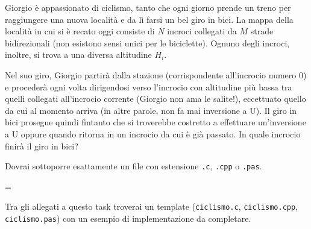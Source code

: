 \usepackage{xcolor}
\usepackage{afterpage}
\usepackage{pifont,mdframed}
\usepackage[bottom]{footmisc}

\makeatletter
\gdef\this@inputfilename{input.txt}
\gdef\this@outputfilename{output.txt}
\makeatother

\newcommand{\inputfile}{\texttt{input.txt}}
\newcommand{\outputfile}{\texttt{output.txt}}

\newenvironment{warning}
  {\par\begin{mdframed}[linewidth=2pt,linecolor=gray]%
    \begin{list}{}{\leftmargin=1cm
                   \labelwidth=\leftmargin}\item[\Large\ding{43}]}
  {\end{list}\end{mdframed}\par}

	Giorgio è appassionato di ciclismo, tanto che ogni giorno prende un treno per raggiungere una nuova localit\`a e da lì farsi un bel giro in bici. La mappa della localit\`a in cui si \`e recato oggi consiste di $N$ incroci collegati da $M$ strade bidirezionali (non esistono sensi unici per le biciclette). Ognuno degli incroci, inoltre, si trova a una diversa altitudine $H_i$.

	Nel suo giro, Giorgio partir\`a dalla stazione (corrispondente all'incrocio numero 0) e proceder\`a ogni volta dirigendosi verso l'incrocio con altitudine più bassa tra quelli collegati all'incrocio corrente (Giorgio non ama le salite!), eccettuato quello da cui al momento arriva (in altre parole, non fa mai inversione a U). Il giro in bici prosegue quindi fintanto che si troverebbe costretto a effettuare un'inversione a U oppure quando ritorna in un incrocio da cui \`e gi\`a passato. In quale incrocio finir\`a il giro in bici?

\Implementation
Dovrai sottoporre esattamente un file con estensione \texttt{.c}, \texttt{.cpp} o \texttt{.pas}.

\begin{warning}
Tra gli allegati a questo task troverai un template (\texttt{ciclismo.c}, \texttt{ciclismo.cpp}, \texttt{ciclismo.pas}) con un esempio di implementazione da completare.
\end{warning}

